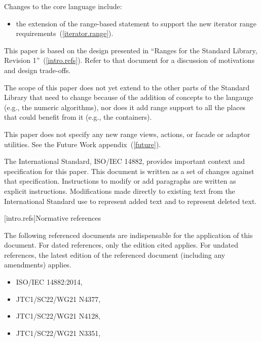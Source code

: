 \pnum
Changes to the core language include:

\begin{itemize}
\item the extension of the range-based  statement to support
the new iterator range requirements~(\ref{iterator.range}).
\end{itemize}

\pnum
This paper is based on the design presented in ``Ranges for the Standard Library,
Revision 1''~(\ref{intro.refs}). Refer to that document for a discussion of
motivations and design trade-offs.

\pnum
The scope of this paper does not yet extend to the other parts of the Standard Library
that need to change because of the addition of concepts to the langauge (e.g., the numeric
algorithms), nor does it add range support to all the places that could benefit from it (e.g.,
the containers).

\pnum
This paper does not specify any new range views, actions, or facade or adaptor
utilities. See the Future Work appendix~(\ref{future}).

\pnum
The International Standard, ISO/IEC 14882, provides important context
and specification for this paper. This document is
written as a set of changes against that specification. Instructions
to modify or add paragraphs are written as explicit instructions.
Modifications made directly to existing text from the International
Standard use  to represent added text and
 to represent deleted text.

[intro.refs]{Normative references}

\pnum
The following referenced documents are indispensable for the
application of this document. For dated references, only the
edition cited applies. For undated references, the latest edition
of the referenced document (including any amendments) applies.

\begin{itemize}
\item ISO/IEC 14882:2014, 
\item JTC1/SC22/WG21 N4377, 
\item JTC1/SC22/WG21 N4128, 
\item JTC1/SC22/WG21 N3351, 
\end{itemize}

